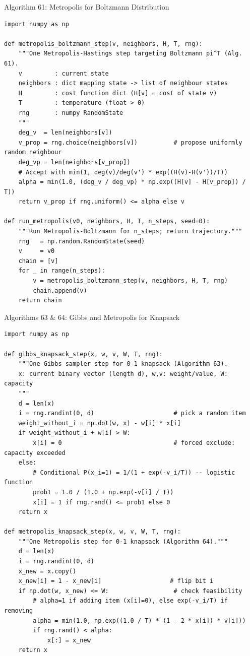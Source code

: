\documentclass[aspectratio=169,10pt]{beamer}
\begin{document}
\begin{frame}[fragile]{Algorithm 61: Metropolis for Boltzmann Distribution}
  \begin{lstlisting}[style=python]
import numpy as np

def metropolis_boltzmann_step(v, neighbors, H, T, rng):
    """One Metropolis-Hastings step targeting Boltzmann pi^T (Alg. 61).
    v         : current state
    neighbors : dict mapping state -> list of neighbour states
    H         : cost function dict (H[v] = cost of state v)
    T         : temperature (float > 0)
    rng       : numpy RandomState
    """
    deg_v  = len(neighbors[v])
    v_prop = rng.choice(neighbors[v])          # propose uniformly random neighbour
    deg_vp = len(neighbors[v_prop])
    # Accept with min(1, deg(v)/deg(v') * exp((H(v)-H(v'))/T))
    alpha = min(1.0, (deg_v / deg_vp) * np.exp((H[v] - H[v_prop]) / T))
    return v_prop if rng.uniform() <= alpha else v

def run_metropolis(v0, neighbors, H, T, n_steps, seed=0):
    """Run Metropolis-Boltzmann for n_steps; return trajectory."""
    rng   = np.random.RandomState(seed)
    v     = v0
    chain = [v]
    for _ in range(n_steps):
        v = metropolis_boltzmann_step(v, neighbors, H, T, rng)
        chain.append(v)
    return chain
  \end{lstlisting}
\end{frame}

\begin{frame}[fragile]{Algorithms 63 \& 64: Gibbs and Metropolis for Knapsack}
  \begin{lstlisting}[style=python]
import numpy as np

def gibbs_knapsack_step(x, w, v, W, T, rng):
    """One Gibbs sampler step for 0-1 knapsack (Algorithm 63).
    x: current binary vector (length d), w,v: weight/value, W: capacity
    """
    d = len(x)
    i = rng.randint(0, d)                      # pick a random item
    weight_without_i = np.dot(w, x) - w[i] * x[i]
    if weight_without_i + w[i] > W:
        x[i] = 0                               # forced exclude: capacity exceeded
    else:
        # Conditional P(x_i=1) = 1/(1 + exp(-v_i/T)) -- logistic function
        prob1 = 1.0 / (1.0 + np.exp(-v[i] / T))
        x[i] = 1 if rng.rand() <= prob1 else 0
    return x

def metropolis_knapsack_step(x, w, v, W, T, rng):
    """One Metropolis step for 0-1 knapsack (Algorithm 64)."""
    d = len(x)
    i = rng.randint(0, d)
    x_new = x.copy()
    x_new[i] = 1 - x_new[i]                   # flip bit i
    if np.dot(w, x_new) <= W:                  # check feasibility
        # alpha=1 if adding item (x[i]=0), else exp(-v_i/T) if removing
        alpha = min(1.0, np.exp((1.0 / T) * (1 - 2 * x[i]) * v[i]))
        if rng.rand() < alpha:
            x[:] = x_new
    return x
  \end{lstlisting}
\end{frame}
\end{document}
